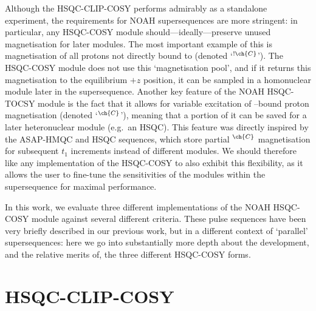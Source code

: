 \documentclass[a4paper,12pt]{article}
\newcommand{\carbon}{\ch{^{13}C}}
\newcommand{\magn}[1]{\ch{^1H}$^{\ch{#1}}$}
\newcommand{\magnnot}[1]{\ch{^1H}$^{!\ch{#1}}$}
\begin{document}
\begin{refsection}
Although the HSQC-CLIP-COSY performs admirably as a standalone experiment, the requirements for NOAH supersequences are more stringent: in particular, any HSQC-COSY module should---ideally---preserve unused magnetisation for later modules.
The most important example of this is magnetisation of all protons not directly bound to \carbon{} (denoted\autocite{Orts2018M,Yong2021JMR} `\magnnot{C}').
The HSQC-COSY module does not use this `magnetisation pool', and if it returns this magnetisation to the equilibrium $+z$ position, it can be sampled in a homonuclear module later in the supersequence.
Another key feature of the NOAH HSQC-TOCSY module is the fact that it allows for variable excitation of \carbon{}--bound proton magnetisation (denoted `\magn{C}'), meaning that a portion of it can be saved for a later heteronuclear module (e.g.\ an HSQC).
This feature was directly inspired by the ASAP-HMQC\autocite{Kupce2007MRC} and HSQC\autocite{SchulzeSunninghausen2014JACS,SchulzeSunninghausen2017JMR,Koos2019JMR,Becker2019JMR} sequences, which store partial \magn{C} magnetisation for subsequent $t_1$ increments instead of different modules.
We should therefore like any implementation of the HSQC-COSY to also exhibit this flexibility, as it allows the user to fine-tune the sensitivities of the modules within the supersequence for maximal performance.

In this work, we evaluate three different implementations of the NOAH HSQC-COSY module against several different criteria.
These pulse sequences have been very briefly described in our previous work, but in a different context of `parallel' supersequences\autocite{Kupce2021JACSA}: here we go into substantially more depth about the development, and the relative merits of, the three different HSQC-COSY forms.


\section{HSQC-CLIP-COSY}


\end{refsection}
\end{document}
